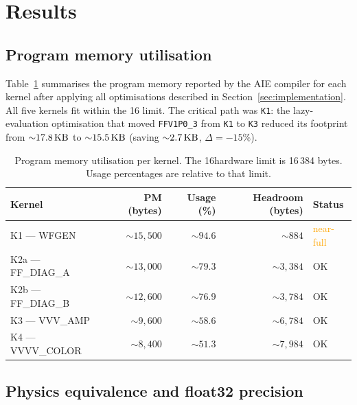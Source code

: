 
\section{Results}\label{sec:results}

\subsection{Program memory utilisation}\label{sec:res_pm}

Table~\ref{tab:pm_results} summarises the program memory reported by the AIE
compiler for each kernel after applying all optimisations described in
Section~\ref{sec:implementation}.  All five kernels fit within the 16\KB
limit.  The critical path was \texttt{K1}: the lazy-evaluation optimisation
that moved \texttt{FFV1P0\_3} from \texttt{K1} to \texttt{K3} reduced its
footprint from ${\sim}17.8\,\text{KB}$ to ${\sim}15.5\,\text{KB}$ (saving ${\sim}2.7\,\text{KB}$,
$\Delta = -15\%$).

\begin{table}[h]
\caption{Program memory utilisation per kernel.  The 16\KB hardware limit is
16\,384 bytes.  Usage percentages are relative to that limit.}
\label{tab:pm_results}
\begin{tabular}{@{}lrrrl@{}}
\toprule
Kernel & PM (bytes) & Usage (\%) & Headroom (bytes) & Status \\
\midrule
K1 — WFGEN          & ${\sim}15{,}500$ & ${\sim}94.6$ & ${\sim}884$ & \textcolor{orange}{near-full} \\
K2a — FF\_DIAG\_A   & ${\sim}13{,}000$ & ${\sim}79.3$ & ${\sim}3{,}384$ & OK \\
K2b — FF\_DIAG\_B   & ${\sim}12{,}600$ & ${\sim}76.9$ & ${\sim}3{,}784$ & OK \\
K3 — VVV\_AMP       & ${\sim}9{,}600$  & ${\sim}58.6$ & ${\sim}6{,}784$ & OK \\
K4 — VVVV\_COLOR    & ${\sim}8{,}400$  & ${\sim}51.3$ & ${\sim}7{,}984$ & OK \\
\bottomrule
\end{tabular}
\end{table}

\subsection{Physics equivalence and float32 precision}\label{sec:res_prec}

